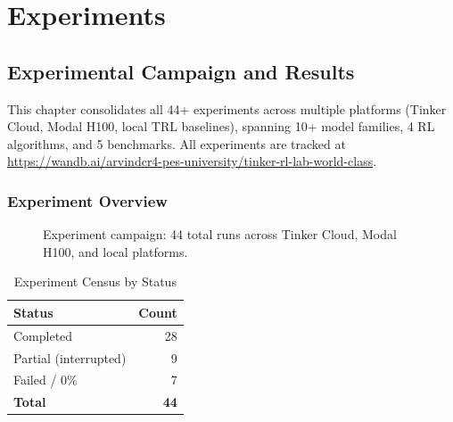 \documentclass[12pt,a4paper]{report}
\theoremstyle{definition}
\begin{document}
\part{Experiments}


\chapter{Experimental Campaign and Results}
\label{ch:experiments}

This chapter consolidates all 44+ experiments across multiple platforms (Tinker Cloud, Modal H100, local TRL baselines),
spanning 10+ model families, 4 RL algorithms, and 5 benchmarks. All experiments are tracked at
\url{https://wandb.ai/arvindcr4-pes-university/tinker-rl-lab-world-class}.

\section{Experiment Overview}
\label{sec:exp-overview}

\begin{figure}[htbp]
\centering
{}
\caption{Experiment campaign: 44 total runs across Tinker Cloud, Modal H100, and local platforms.}
\label{fig:exp-status}
\end{figure}


\begin{table}[htbp]
\centering
\caption{Experiment Census by Status}
\begin{tabular}{lr}
\toprule
\textbf{Status} & \textbf{Count} \\
\midrule
Completed & 28 \\
Partial (interrupted) & 9 \\
Failed / 0\% & 7 \\
\midrule
\textbf{Total} & \textbf{44} \\
\bottomrule
\end{tabular}
\label{tab:exp-census}
\end{table}
\end{document}
